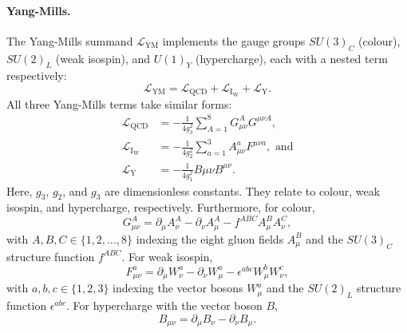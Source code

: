 \paragraph{Yang-Mills.}
The Yang-Mills summand $\mathcal{L}_\mathrm{YM}$ implements the gauge groups
$SU\!(3)_C$ (colour), $SU\!(2)_L$ (weak isospin), and $U\!(1)_Y$ (hypercharge),
each with a nested term respectively:
\begin{equation}
\label{eqn:theory_sm_lagrangian_top_ym}
\mathcal{L}_\mathrm{YM} =
\mathcal{L}_\mathrm{QCD}
+ \mathcal{L}_\mathrm{I_W}
+ \mathcal{L}_\mathrm{Y}
.
\end{equation}
All three Yang-Mills terms take similar forms:
\begin{align}
\label{eqn:theory_sm_lagrangian_top_ym_terms}
\mathcal{L}_\mathrm{QCD} &=
-\frac{1}{4g^2_3}
\sum_{A=1}^8 G^A_{\mu\nu} G^{\mu\nu A}
,\\
\mathcal{L}_\mathrm{I_W} &=
-\frac{1}{4g^2_2}
\sum_{a=1}^3 A^a_{\mu\nu} F^{\mu\nu a}
,\textrm{ and}\\
\mathcal{L}_\mathrm{Y} &=
-\frac{1}{4g^2_1} B{\mu\nu} B^{\mu\nu}
.
\end{align}
Here, $g_3$, $g_2$, and $g_3$ are dimensionless constants.
They relate to colour, weak isospin, and hypercharge, respectively.
Furthermore, for colour,
\begin{equation}
G^A_{\mu\nu} =
\partial_\mu A^A_\nu - \partial_\nu A^A_\mu - f^{ABC} A^B_\mu A^C_\nu
,
\end{equation}
with $A, B, C \in \{1, 2, ..., 8\}$ indexing the eight gluon fields $A^B_\mu$ and
the $SU\!(3)_C$ structure function $f^{ABC}$.
For weak isospin,
\begin{equation}
F^a_{\mu\nu} =
\partial_\mu W^a_\nu - \partial_\nu W^a_\mu - \epsilon^{abc} W^b_\mu W^c_\nu
,
\end{equation}
with $a, b, c \in \{1, 2, 3\}$ indexing the vector bosons $W^a_\mu$ and
the $SU\!(2)_L$ structure function $\epsilon^{abc}$.
For hypercharge with the vector boson $B$,
\begin{equation}
B_{\mu\nu} =
\partial_\mu B_\nu - \partial_\nu B_\mu
.
\end{equation}

